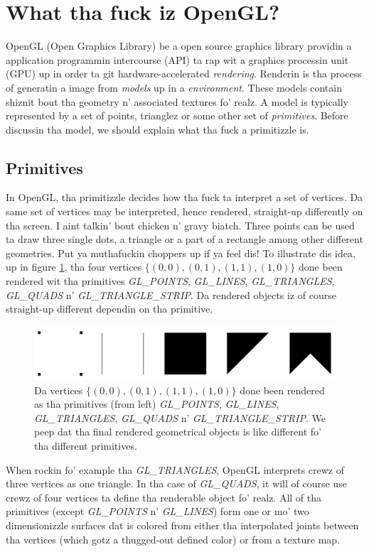 \section{What tha fuck iz OpenGL?}
\label{sec:opengl}
OpenGL (Open Graphics Library) be a open source graphics library providin a application programmin intercourse (API) ta rap wit a graphics processin unit (GPU) up in order ta git hardware-accelerated \textit{rendering}. Renderin is tha process of generatin a image from \textit{models} up in a \textit{environment}. These models contain shiznit bout tha geometry n' associated textures fo' realz. A model is typically represented by a set of points, trianglez or some other set of \textit{primitives}. Before discussin tha model, we should explain what tha fuck a primitizzle is.
\subsection{Primitives}
In OpenGL, tha primitizzle decides how tha fuck ta interpret a set of vertices. Da same set of vertices may be interpreted, hence rendered, straight-up differently on tha screen. I aint talkin' bout chicken n' gravy biatch. Three points can be used ta draw three single dots, a triangle or a part of a rectangle among other different geometries. Put ya muthafuckin choppers up if ya feel dis! To illustrate dis idea, up in figure \ref{fig:opengl_primitives}, tha four vertices $\{(0,0), (0,1), (1,1), (1,0)\}$ done been rendered wit tha primitives \textit{GL\_POINTS}, \textit{GL\_LINES}, \textit{GL\_TRIANGLES}, \textit{GL\_QUADS} n' \textit{GL\_TRIANGLE\_STRIP}. Da rendered objects iz of course straight-up different dependin on tha primitive. 
\begin{figure}[h]
\begin{center}
\includegraphics[width=\textwidth, trim=0cm 0cm 0cm 0cm, clip]{opengl/figures/primitives.png}
\end{center}
\caption{Da vertices $\{(0,0), (0,1), (1,1), (1,0)\}$ done been rendered as tha primitives (from left) \textit{GL\_POINTS}, \textit{GL\_LINES}, \textit{GL\_TRIANGLES}, \textit{GL\_QUADS} n' \textit{GL\_TRIANGLE\_STRIP}. We peep dat tha final rendered geometrical objects is like different fo' tha different primitives.}
\label{fig:opengl_primitives}
\end{figure}
When rockin fo' example tha \textit{GL\_TRIANGLES}, OpenGL interprets crewz of three vertices as one triangle. In tha case of \textit{GL\_QUADS}, it will of course use crewz of four vertices ta define tha renderable object fo' realz. All of tha primitives (except \textit{GL\_POINTS} n' \textit{GL\_LINES}) form one or mo' two dimensionizzle surfaces dat is colored from either tha interpolated joints between tha vertices (which gotz a thugged-out defined color) or from a texture map.

